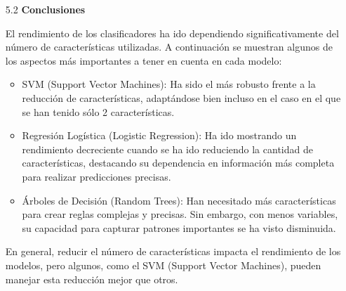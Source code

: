 \documentclass{article}
\begin{document}
\begin{itemize}

\item[5.2]  {\bf Conclusiones}

El rendimiento de los clasificadores ha ido dependiendo significativamente del número de caracter\'isticas utilizadas. A continuaci\'on se muestran algunos de los aspectos m\'as importantes a tener en cuenta en cada modelo:

\begin{itemize}

\item
SVM (Support Vector Machines): Ha sido el m\'as robusto frente a la reducci\'on de caracter\'isticas, adapt\'andose bien incluso en el caso en el que se han tenido s\'olo 2 caracter\'isticas.

\item
Regresi\'on Log\'istica (Logistic Regression): Ha ido mostrando un rendimiento decreciente cuando se ha ido reduciendo la cantidad de caracter\'isticas, destacando su dependencia en informaci\'on m\'as completa para realizar predicciones precisas.

\item
\'Arboles de Decisi\'on (Random Trees): Han necesitado m\'as caracter\'isticas para crear reglas complejas y precisas. Sin embargo, con menos variables, su capacidad para capturar patrones importantes se ha visto disminuida.

\end{itemize}

En general, reducir el n\'umero de caracter\'isticas impacta el rendimiento de los modelos, pero algunos, como el SVM (Support Vector Machines), pueden manejar esta reducci\'on mejor que otros.

\end{itemize}
\end{document}
